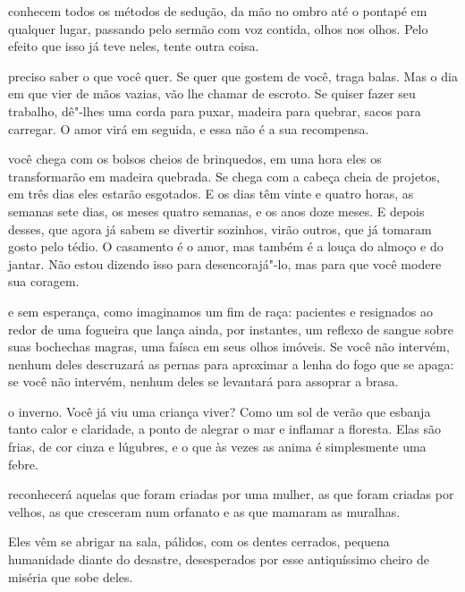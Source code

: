 \pagebreak
\thispagestyle{empty}


\movetooddpage

 conhecem todos os métodos de sedução, da mão no ombro até o pontapé
em qualquer lugar, passando pelo sermão com voz contida, olhos nos
olhos. Pelo efeito que isso já teve neles, tente outra coisa.




 preciso saber o que você quer. Se quer que gostem de você, traga
balas. Mas o dia em que vier de mãos vazias, vão lhe chamar de escroto.
Se quiser fazer seu trabalho, dê"-lhes uma corda para puxar, madeira para
quebrar, sacos para carregar. O amor virá em seguida, e essa não é a sua
recompensa.




 você chega com os bolsos cheios de brinquedos, em uma hora eles os
transformarão em madeira quebrada. Se chega com a cabeça cheia de
projetos, em três dias eles estarão esgotados. E os dias têm vinte e
quatro horas, as semanas sete dias, os meses quatro semanas, e os anos
doze meses. E depois desses, que agora já sabem se divertir sozinhos,
virão outros, que já tomaram gosto pelo tédio. O casamento é o amor, mas
também é a louça do almoço e do jantar. Não estou dizendo isso para
desencorajá"-lo, mas para que você modere sua coragem.


\pagebreak

 e sem esperança, como imaginamos um fim de raça: pacientes e
resignados ao redor de uma fogueira que lança ainda, por instantes, um
reflexo de sangue sobre suas bochechas magras, uma faísca em seus olhos
imóveis. Se você não intervém, nenhum deles descruzará as pernas para
aproximar a lenha do fogo que se apaga: se você não intervém, nenhum
deles se levantará para assoprar a brasa.




 o inverno. Você já viu uma criança viver? Como um sol de verão
que esbanja tanto calor e claridade, a ponto de alegrar o mar e inflamar
a floresta. Elas são frias, de cor cinza e lúgubres, e o que às vezes as
anima é simplesmente uma febre.



 reconhecerá aquelas que foram criadas por uma mulher, as que foram
criadas por velhos, as que cresceram num orfanato e as que mamaram as
muralhas.



 Eles vêm se abrigar na sala, pálidos, com os dentes cerrados,
pequena humanidade diante do desastre, desesperados por esse
antiquíssimo cheiro de miséria que sobe deles.


